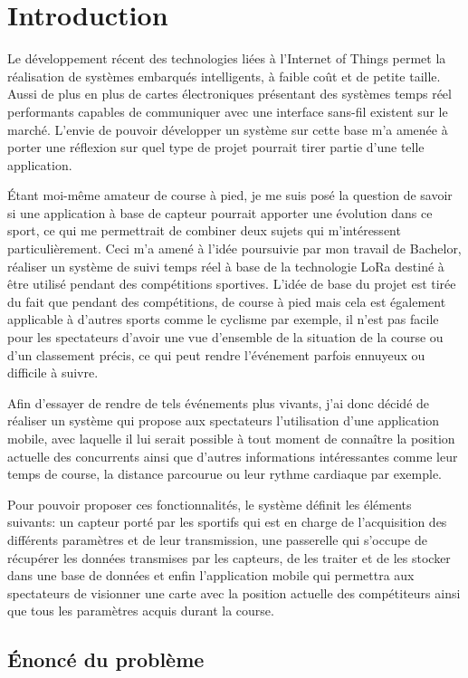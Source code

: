 \chapter{Introduction}

Le développement récent des technologies liées à l'Internet of Things permet la réalisation de systèmes embarqués intelligents, à faible coût et de petite taille. Aussi de plus en plus de cartes électroniques présentant des systèmes temps réel performants capables de communiquer avec une interface sans-fil existent sur le marché. L'envie de pouvoir développer un système sur cette base m'a amenée à porter une réflexion sur quel type de projet pourrait tirer partie d'une telle application. 

Étant moi-même amateur de course à pied, je me suis posé la question de savoir si une application à base de capteur pourrait apporter une évolution dans ce sport, ce qui me permettrait de combiner deux sujets qui m'intéressent particulièrement. Ceci m'a amené à l'idée poursuivie par mon travail de Bachelor, réaliser un système de suivi temps réel à base de la technologie LoRa destiné à être utilisé pendant des compétitions sportives. L'idée de base du projet est tirée du fait que pendant des compétitions, de course à pied mais cela est également applicable à d'autres sports comme le cyclisme par exemple, il n'est pas facile pour les spectateurs d'avoir une vue d'ensemble de la situation de la course ou d’un classement précis, ce qui peut rendre l'événement parfois ennuyeux ou difficile à suivre.

Afin d'essayer de rendre de tels événements plus vivants, j'ai donc décidé de réaliser un système qui propose aux spectateurs l'utilisation d'une application mobile, avec laquelle il lui serait possible à tout moment de connaître la position actuelle des concurrents ainsi que d'autres informations intéressantes comme leur temps de course, la distance parcourue ou leur rythme cardiaque par exemple. 

Pour pouvoir proposer ces fonctionnalités, le système définit les éléments suivants: un capteur porté par les sportifs qui est en charge de l'acquisition des différents paramètres et de leur transmission, une passerelle qui s'occupe de récupérer les données transmises par les capteurs, de les traiter et de les stocker dans une base de données et enfin l'application mobile qui permettra aux spectateurs de visionner une carte avec la position actuelle des compétiteurs ainsi que tous les paramètres acquis durant la course.


\section{Énoncé du problème}

